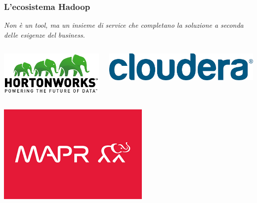 \begin{frame}[t]
\frametitle{L'ecosistema Hadoop}

\begin{block}{}
	\begin{center}
		\textit{Non è un tool, ma un insieme di service che completano la soluzione a seconda delle esigenze del business.}
	\end{center}
\end{block}


\begin{columns}
	\begin{column}{0.5\textwidth}
		\includegraphics[scale=0.4]{img/hws_logo}
	\end{column}
	\begin{column}{0.5\textwidth}
		\includegraphics[scale=0.2]{img/cloudera_logo}
	\end{column}
\end{columns}
\begin{center}
	\includegraphics[scale=0.2]{img/mapR_logo}
\end{center}

\end{frame}

